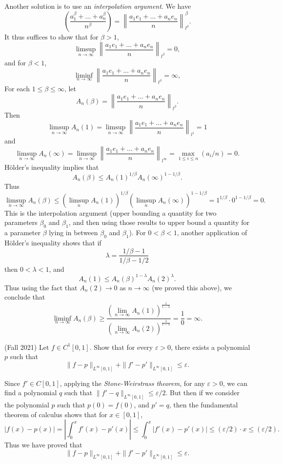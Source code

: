 \documentclass[answers]{exam}
\theoremstyle{problemstyle}
\newcommand{\1}[1]{\textbf{1}_{\left[#1\right]}} %
\begin{document}
\begin{questions}
\begin{parts}
\begin{solution}
		Another solution is to use an \emph{interpolation argument}. We have
		\[ \left( \frac{a_1^\beta + \dots + a_n^\beta}{n^\beta} \right) = \left\| \frac{a_1e_1 + \dots + a_ne_n}{n} \right\|_{l^\beta}^\beta. \]
		It thus suffices to show that for $\beta > 1$,
		\[ \limsup_{n \to \infty} \left\| \frac{a_1e_1 + \dots + a_ne_n}{n} \right\|_{l^\beta} = 0, \]
		and for $\beta < 1$,
		\[ \liminf_{n \to \infty} \left\| \frac{a_1e_1 + \dots + a_ne_n}{n} \right\|_{l^\beta} = \infty, \]
		For each $1 \leq \beta \leq \infty$, let
		\[ A_n(\beta) = \left\| \frac{a_1e_1 + \dots + a_ne_n}{n} \right\|_{l^\beta}. \]
		Then
		\[ \limsup_{n \to \infty} A_n(1) = \limsup_{n \to \infty} \left\| \frac{a_1e_1 + \dots + a_ne_n}{n} \right\|_{l^1} = 1 \]
		and
		\[ \limsup_{n \to \infty} A_n(\infty) = \limsup_{n \to \infty} \left\| \frac{a_1e_1 + \dots + a_ne_n}{n} \right\|_{l^\infty} = \max_{1 \leq i \leq n}(a_i/n) = 0. \]
		H\"{o}lder's inequality implies that
		\[ A_n(\beta) \leq A_n(1)^{1/\beta} A_n(\infty)^{1-1/\beta}. \]
		Thus
		\[ \limsup_{n \to \infty} A_n(\beta) \leq (\limsup_n A_n(1))^{1/\beta} (\limsup_n A_n(\infty))^{1 - 1/\beta} = 1^{1/\beta} \cdot 0^{1 - 1/\beta} = 0. \]
		This is the interpolation argument (upper bounding a quantity for two parameters $\beta_0$ and $\beta_1$, and then using those results to upper bound a quantity for a parameter $\beta$ lying in between $\beta_0$ and $\beta_1$). For $0 < \beta < 1$, another application of H\"{o}lder's inequality shows that if
		\[ \lambda = \frac{1/\beta - 1}{1/\beta - 1/2} \]
		then $0 < \lambda < 1$, and
		\[ A_n(1) \leq A_n(\beta)^{1-\lambda} A_n(2)^\lambda. \]
		Thus using the fact that $A_n(2) \to 0$ as $n \to \infty$ (we proved this above), we conclude that
		\[ \liminf_{n \to \infty} A_n(\beta) \geq \frac{\left( \lim_{n \to \infty} A_n(1) \right)^{\frac{1}{1 - \lambda}}}{\left( \lim_{n \to \infty} A_n(2) \right)^{\frac{\lambda}{1 - \lambda}}} = \frac{1}{0} = \infty. \]
	\end{solution}
\end{parts}


\question (Fall 2021) Let $f \in C^1[0,1]$. Show that for every $\varepsilon > 0$, there exists a polynomial $p$ such that
%
\[ \| f - p \|_{L^\infty[0,1]} + \| f' - p' \|_{L^\infty[0,1]} \leq \varepsilon. \]
\begin{solution}
	Since $f' \in C[0,1]$, applying the \emph{Stone-Weirstrass theorem}, for any $\varepsilon > 0$, we can find a polynomial $q$ such that $\| f' - q \|_{L^\infty[0,1]} \leq \varepsilon / 2$. But then if we consider the polynomial $p$ such that $p(0) = f(0)$, and $p' = q$, then the fundamental theorem of calculus shows that for $x \in [0,1]$,
	\[ |f(x) - p(x)| = \left| \int_0^x f'(x) - p'(x) \right| \leq \int_0^x |f'(x) - p'(x)| \leq (\varepsilon / 2) \cdot x \leq (\varepsilon/2). \]
	Thus we have proved that
	\[ \| f - p \|_{L^\infty[0,1]} + \| f' - p' \|_{L^\infty[0,1]} \leq \varepsilon. \]
\end{solution}
   

\end{questions}
\end{document}
